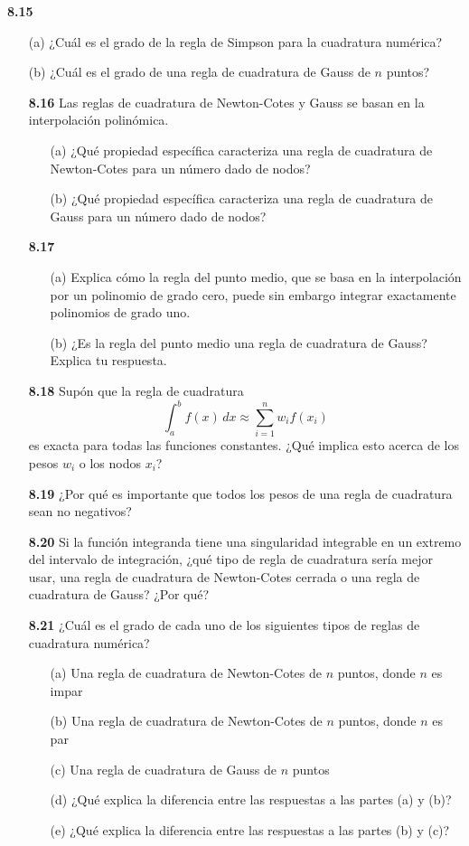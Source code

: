 \documentclass{article}
\begin{document}
\textbf{8.15} 
\begin{itemize}
    \item [(a)] ¿Cuál es el grado de la regla de Simpson para la cuadratura numérica?
    \item[(b)] ¿Cuál es el grado de una regla de cuadratura de Gauss de \(n\) puntos?

\textbf{8.16} Las reglas de cuadratura de Newton-Cotes y Gauss se basan en la interpolación polinómica.

\begin{itemize}
    \item[(a)] ¿Qué propiedad específica caracteriza una regla de cuadratura de Newton-Cotes para un número dado de nodos?
    \item[(b)] ¿Qué propiedad específica caracteriza una regla de cuadratura de Gauss para un número dado de nodos?
\end{itemize}

\textbf{8.17}
\begin{itemize}
    \item[(a)] Explica cómo la regla del punto medio, que se basa en la interpolación por un polinomio de grado cero, puede sin embargo integrar exactamente polinomios de grado uno.
    \item[(b)] ¿Es la regla del punto medio una regla de cuadratura de Gauss? Explica tu respuesta.
\end{itemize}

\textbf{8.18} Supón que la regla de cuadratura
\[
\int_a^b f(x) \, dx \approx \sum_{i=1}^n w_i f(x_i)
\]
es exacta para todas las funciones constantes. ¿Qué implica esto acerca de los pesos \(w_i\) o los nodos \(x_i\)?

\textbf{8.19} ¿Por qué es importante que todos los pesos de una regla de cuadratura sean no negativos?

\textbf{8.20} Si la función integranda tiene una singularidad integrable en un extremo del intervalo de integración, ¿qué tipo de regla de cuadratura sería mejor usar, una regla de cuadratura de Newton-Cotes cerrada o una regla de cuadratura de Gauss? ¿Por qué?

\textbf{8.21} ¿Cuál es el grado de cada uno de los siguientes tipos de reglas de cuadratura numérica?
\begin{itemize}
    \item[(a)] Una regla de cuadratura de Newton-Cotes de \(n\) puntos, donde \(n\) es impar
    \item[(b)] Una regla de cuadratura de Newton-Cotes de \(n\) puntos, donde \(n\) es par
    \item[(c)] Una regla de cuadratura de Gauss de \(n\) puntos
    \item[(d)] ¿Qué explica la diferencia entre las respuestas a las partes (a) y (b)?
    \item[(e)] ¿Qué explica la diferencia entre las respuestas a las partes (b) y (c)?
\end{itemize}


\end{itemize}
\end{document}
